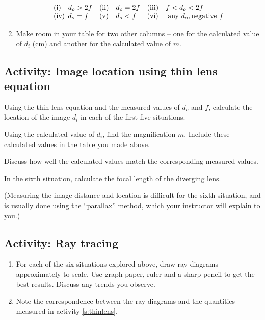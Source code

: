 \begin{multicols}{2}
\begin{enumerate}
\begin{equation*}
\begin{array}{lll}
	\text{(i)} \quad d_o > 2f	& \text{(ii)} \quad d_o = 2f 
	& \text{(iii)} \quad f < d_o < 2f \\
	\text{(iv)}\;\, d_o = f	& \text{(v)} \quad d_o < f  %
	& \text{(vi) \quad any}\  d_o, \text{negative}\  f
\end{array}
\end{equation*}
		
	\item Make room in your table for two other columns -- one for the calculated value of $d_i$ (cm) and another for the calculated value of $m$.
\end{enumerate}

\subsection{Activity: Image location using thin lens equation}
\begin{enumerate}
	\item Using the thin lens equation and the measured values of $d_o$ and $f$, calculate the location of the image $d_i$ in each of the first five situations. 
	\item Using the calculated value of $d_i$, find the magnification $m$. Include these calculated values in the table you made above. 
	\item Discuss how well the calculated values match the corresponding measured values. 
	\item In the sixth situation, calculate the focal length of the diverging lens.
	{\item (Measuring the image distance and location is difficult for the sixth situation, and is usually done using the ``parallax'' method, which your instructor will explain to you.)}
\end{enumerate}

\subsection{Activity: Ray tracing}
\begin{enumerate}
	\item For each of the six situations explored above, draw ray diagrams approximately to scale. Use graph paper, ruler and a sharp pencil to get the best results. Discuss any trends you observe. 
	\item Note the correspondence between the ray diagrams and the quantities measured in activity \ref{s:thinlens}.
\end{enumerate}


\end{multicols}
